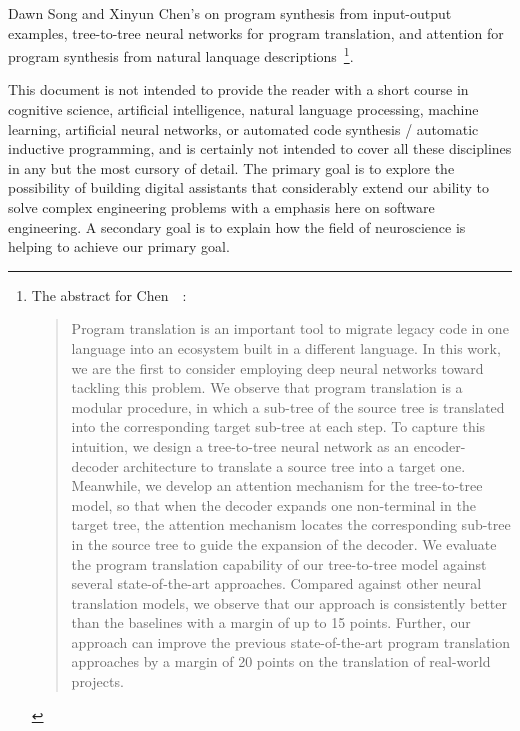 Dawn Song and Xinyun Chen's {} on program synthesis from input-output examples, tree-to-tree neural networks for program translation, and attention for program synthesis from natural lanquage descriptions~\cite{ChenetalICLR-18b}\footnote{%
%
  The abstract for Chen~\etal{}~\cite{ChenetalICLR-18b}:
%
  \begin{quotation}
%
    Program translation is an important tool to migrate legacy code in one language into an ecosystem built in a different language. In this work, we are the first to consider employing deep neural networks toward tackling this problem. We observe that program translation is a modular procedure, in which a sub-tree of the source tree is translated into the corresponding target sub-tree at each step. To capture this intuition, we design a tree-to-tree neural network as an encoder-decoder architecture to translate a source tree into a target one. Meanwhile, we develop an attention mechanism for the tree-to-tree model, so that when the decoder expands one non-terminal in the target tree, the attention mechanism locates the corresponding sub-tree in the source tree to guide the expansion of the decoder. We evaluate the program translation capability of our tree-to-tree model against several state-of-the-art approaches. Compared against other neural translation models, we observe that our approach is consistently better than the baselines with a margin of up to 15 points. Further, our approach can improve the previous state-of-the-art program translation approaches by a margin of 20 points on the translation of real-world projects.
%
  \end{quotation}}.



This document is not intended to provide the reader with a short course in cognitive science, artificial intelligence, natural language processing, machine learning, artificial neural networks, or automated code synthesis / automatic inductive programming, and is certainly not intended to cover all these disciplines in any but the most cursory of detail. The primary goal is to explore the possibility of building digital assistants that considerably extend our ability to solve complex engineering problems with a emphasis here on software engineering. A secondary goal is to explain how the field of neuroscience is helping to achieve our primary goal. 

